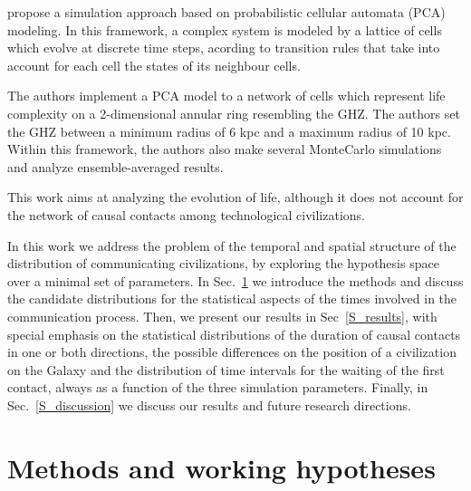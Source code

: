 \documentclass[crop]{CSLB}%
\begin{document}
\citet{vukotic_astrobiological_2012} propose a simulation approach
based on probabilistic cellular automata (PCA) modeling. In this
framework, a complex system is modeled by a lattice of cells which
evolve at discrete time steps, acording to transition rules that take
into account for each cell the states of its neighbour cells.

The authors implement a PCA model to a network of cells which
represent life complexity on a 2-dimensional annular ring resembling
the GHZ. The authors set the GHZ between a minimum radius of 6 kpc and
a maximum radius of 10 kpc. Within this framework, the authors also
make several MonteCarlo simulations and analyze ensemble-averaged
results.

This work aims at analyzing the evolution of life, although it does
not account for the network of causal contacts among technological
civilizations.


In this work we address the problem of the temporal and spatial
structure of the distribution of communicating civilizations, by
exploring the hypothesis space over a minimal set of parameters.
%
In Sec.~\ref{S_methods} we introduce the methods and discuss the
candidate distributions for the statistical aspects of the times
involved in the communication process.
%
Then, we present our results in Sec~\ref{S_results}, with special
emphasis on the statistical distributions of the duration of causal
contacts in one or both directions, the possible differences on the
position of a civilization on the Galaxy and the distribution of time
intervals for the waiting of the first contact, always as a function
of the three simulation parameters.
%
Finally, in Sec.~\ref{S_discussion} we discuss our results and future
research directions.





\section{Methods and working hypotheses}\label{S_methods}
\end{document}
